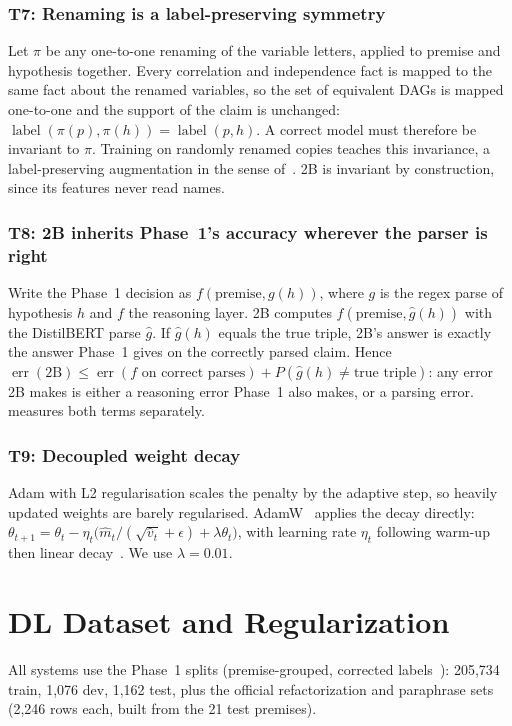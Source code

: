 \documentclass[12pt,a4paper]{article}
\newenvironment{theorybox}[1]{\subsubsection*{#1}}{}
\begin{document}
\begin{theorybox}{T7: Renaming is a label-preserving symmetry}
Let $\pi$ be any one-to-one renaming of the variable letters, applied to premise and hypothesis together. Every
correlation and independence fact is mapped to the same fact about the renamed variables, so the set of equivalent DAGs is
mapped one-to-one and the support of the claim is unchanged: $\operatorname{label}(\pi(p),\pi(h))=\operatorname{label}(p,h)$.
A correct model must therefore be invariant to $\pi$. Training on randomly renamed copies teaches this invariance, a
label-preserving augmentation in the sense of~\cite{kaushik2020,wei2019}. 2B is invariant by construction, since its features
never read names.
\end{theorybox}

\begin{theorybox}{T8: 2B inherits Phase~1's accuracy wherever the parser is right}
Write the Phase~1 decision as $f(\text{premise}, g(h))$, where $g$ is the regex parse of hypothesis $h$ and $f$ the reasoning
layer. 2B computes $f(\text{premise}, \hat g(h))$ with the DistilBERT parse $\hat g$. If $\hat g(h)$ equals the true triple,
2B's answer is exactly the answer Phase~1 gives on the correctly parsed claim. Hence
$\operatorname{err}(\text{2B}) \le \operatorname{err}(f \text{ on correct parses}) + P(\hat g(h)\neq\text{true triple})$:
any error 2B makes is either a reasoning error Phase~1 also makes, or a parsing error.  measures both terms
separately.
\end{theorybox}

\begin{theorybox}{T9: Decoupled weight decay}
Adam with L2 regularisation scales the penalty by the adaptive step, so heavily updated weights are barely regularised.
AdamW~\cite{loshchilov2019} applies the decay directly: $\theta_{t+1}=\theta_t-\eta_t\big(\hat m_t/(\sqrt{\hat v_t}+\epsilon)+\lambda\theta_t\big)$,
with learning rate $\eta_t$ following warm-up then linear decay~\cite{howard2018}. We use $\lambda=0.01$.
\end{theorybox}

\section{DL Dataset and Regularization}\label{sec:data}

All systems use the Phase~1 splits (premise-grouped, corrected labels~\cite{corr2causecorrected}): 205{,}734 train, 1{,}076 dev,
1{,}162 test, plus the official refactorization and paraphrase sets (2{,}246 rows each, built from the 21 test premises).
\end{document}
